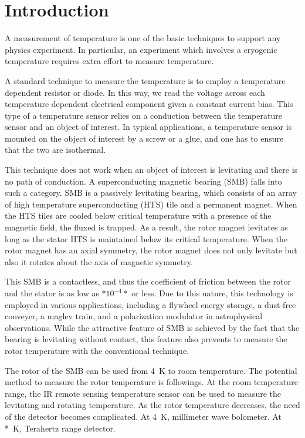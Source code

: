 \section{Introduction}

A measurement of temperature is one of the basic techniques to support any physics experiment. 
In particular, an experiment which involves a cryogenic temperature requires extra effort to measure temperature.

A standard technique to measure the temperature is to employ a temperature dependent resistor or diode. 
In this way, we read the voltage across each temperature dependent electrical component given a constant current bias. 
This type of a temperature sensor relies on a conduction between the temperature sensor and an object of interest. 
In typical applications, a temperature sensor is mounted on the object of interest by a screw or a glue, and one has to ensure that the two are isothermal. 

This technique does not work when an object of interest is levitating and there is no path of conduction. 
A superconducting magnetic bearing (SMB) falls into such a category. 
SMB is a passively levitating bearing, which consists of an array of high temperature superconducting (HTS) tile and a permanent magnet. 
When the HTS tiles are cooled below critical temperature with a presence of the magnetic field, the fluxed is trapped. 
As a result, the rotor magnet levitates as long as the stator HTS is maintained below its critical temperature. 
When the rotor magnet has an axial symmetry, the rotor magnet does not only levitate but also it rotates about the axis of magnetic symmetry. 

This SMB is a contactless, and thus the coefficient of friction between the rotor and the stator is as low as $*10^{-4}*$ or less. 
Due to this nature, this technology is employed in various applications, including a flywheel energy storage, a dust-free conveyer, a maglev train, and a polarization modulator in astrophysical observations.
While the attractive feature of SMB is achieved by the fact that the bearing is levitating without contact, this feature also prevents to measure the rotor temperature with the conventional technique. 

The rotor of the SMB can be used from 4~K to room temperature. 
The potential method to measure the rotor temperature is followings.
At the room temperature range, the IR remote sensing temperature sensor can be used to measure the levitating and rotating temperature. 
As the rotor temperature decreases, the need of the detector becomes complicated. 
At 4~K, millimeter wave bolometer. 
At *~K, Terahertz range detector. 

